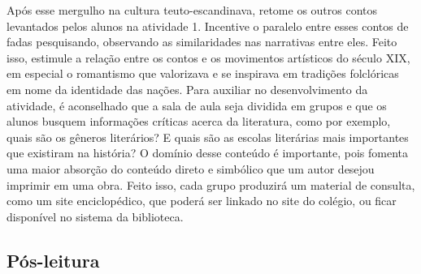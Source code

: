 \documentclass[12pt]{extarticle}
\begin{document}

Após esse mergulho na cultura teuto-escandinava, retome os
outros contos levantados pelos alunos na atividade 1. Incentive o
paralelo entre esses contos de fadas pesquisando, observando as
similaridades nas narrativas entre eles. Feito isso, estimule a relação
entre os contos e os movimentos artísticos do século XIX, em especial o
romantismo que valorizava e se inspirava em tradições folclóricas em
nome da identidade das nações. Para auxiliar no desenvolvimento da
atividade, é aconselhado que a sala de aula seja dividida em grupos e
que os alunos busquem informações críticas acerca da literatura, como
por exemplo, quais são os gêneros literários? E quais são as escolas
literárias mais importantes que existiram na história? O domínio desse
conteúdo é importante, pois fomenta uma maior absorção do conteúdo
direto e simbólico que um autor desejou imprimir em uma obra. Feito
isso, cada grupo produzirá um material de consulta, como um site
enciclopédico, que poderá ser linkado no site do colégio, ou ficar
disponível no sistema da biblioteca.

\subsection{Pós-leitura}

\end{document}
